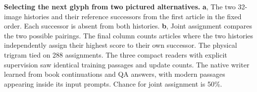 \textbf{Selecting the next glyph from two pictured alternatives.}
\textbf{a}, The two 32-image histories and their reference successors from
the first article in the fixed order. Each successor is absent from both
histories. \textbf{b}, Joint assignment compares the two possible pairings.
The final column counts articles where the two histories independently
assign their highest score to their own successor. The physical trigram tied
on 288 assignments. The three compact readers with explicit supervision
saw identical training passages and update counts. The native writer learned from book continuations
and QA answers, with modern passages appearing inside its input prompts. Chance for joint assignment is 50\%.
